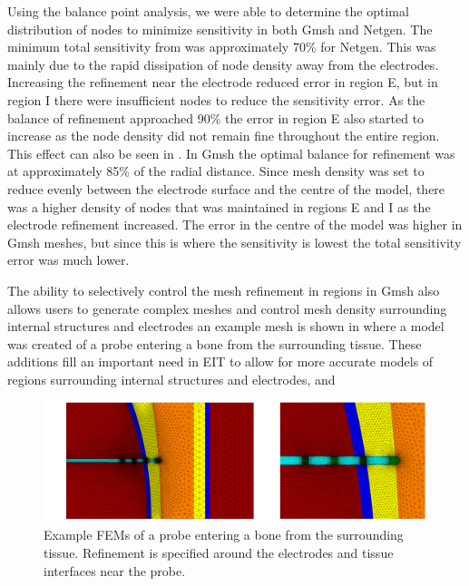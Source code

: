 Using the balance point analysis, we were able to determine the optimal distribution
of nodes to minimize sensitivity in both Gmsh and Netgen. The minimum total sensitivity 
from  was approximately 70\% for Netgen. This was mainly 
due to the rapid dissipation of node density away from the electrodes. Increasing 
the refinement near the electrode reduced
error in region E, but in region I there were insufficient
nodes to reduce the sensitivity error. As the balance of refinement approached
90\% the error in region E also started to increase as the node density did not remain
fine throughout the entire region. This effect can also be seen in .
In Gmsh the optimal balance for refinement was at approximately 85\%
of the radial distance. Since mesh density was set to reduce evenly 
between the electrode surface and the centre of the model, there 
was a higher density of nodes that was maintained in regions E and I as the 
electrode refinement increased. The error in the centre of the model 
was higher in Gmsh meshes, but since this is where the sensitivity is 
lowest the total sensitivity error was much lower. 

The ability to selectively control the mesh refinement in regions in Gmsh also allows 
users to generate complex meshes and control mesh density surrounding internal structures 
and electrodes an example mesh is shown in  where a model was
created of
a probe entering a bone from the surrounding tissue. 
These additions fill an important need in EIT to allow for more accurate models 
of regions surrounding internal structures and electrodes, and 

\begin{figure}
  \includegraphics[width=\columnwidth]{chapter4-mesh_refinement/imgs/advanced_mesh_combined.pdf}
    \caption[Advanced mesh example of an internal probe]{\label{fig:adv_mesh} Example FEMs of a probe entering a bone from the surrounding 
    tissue. Refinement is specified around the electrodes and tissue interfaces near the probe.}
\end{figure}

